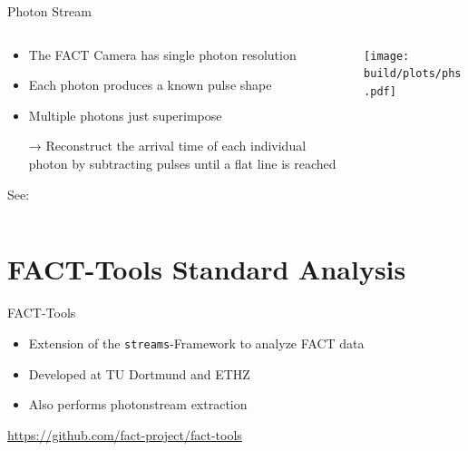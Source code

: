 \documentclass[compress, 9pt, aspectratio=1610, professionalfonts]{beamer}
\begin{document}
\begin{frame}[c]{Photon Stream}
  \begin{columns}[onlytextwidth]
    \begin{column}{0.475\textwidth}
      \begin{itemize}
        \item The FACT Camera has single photon resolution
        \item Each photon produces a known pulse shape 
        \item Multiple photons just superimpose
        \item[→] Reconstruct the arrival time of each individual photon by subtracting pulses until a flat line is reached
      \end{itemize}
      \begin{center}
        \small See: \cite{photonstream}
      \end{center}
    \end{column}
    \begin{column}{0.475\textwidth}
      \texttt{[image: build/plots/phs.pdf]}
    \end{column}
  \end{columns}
\end{frame}

\section{FACT-Tools Standard Analysis}
\begin{frame}[t]{FACT-Tools}
  \begin{itemize}
    \item Extension of the \texttt{streams}-Framework to analyze FACT data
    \item Developed at TU Dortmund and ETHZ
    \item Also performs photonstream extraction
  \end{itemize}

  \vspace{0.25cm}
  \begin{center}
    \Large\url{https://github.com/fact-project/fact-tools}
  \end{center}

  \vspace{0.25cm}
  \begin{center}
    \begin{tikzpicture}[scale=1, transform shape]
      
    \end{tikzpicture}
  \end{center}
\end{frame}
\end{document}
